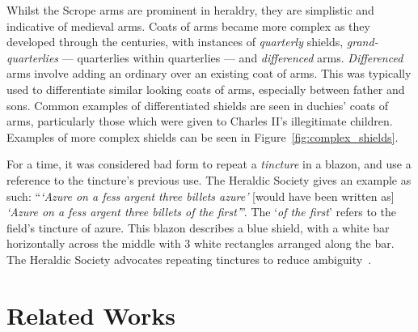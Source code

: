 \documentclass[nobib, a4paper, twoside, justified]{tufte-book}
\makeatletter
\newcommand{\blazon}{\gls{blazon}\@\xspace}
\makeatother
\begin{document}
Whilst the Scrope arms are prominent in heraldry, they are simplistic and indicative of
medieval arms. Coats of arms became more complex as they developed through the centuries, with
instances of \textit{quarterly} shields, \textit{grand-quarterlies} --- quarterlies within
quarterlies --- and \textit{differenced} arms. \textit{Differenced} arms involve adding an
\gls{ordinary} over an existing coat of arms. This was typically used to differentiate similar
looking coats of arms, especially between father and sons. Common examples of differentiated
shields are seen in duchies' coats of arms, particularly those which were given to Charles II's
illegitimate children. Examples of more complex shields can be seen in
Figure~\ref{fig:complex_shields}.

\begin{figure*}[h]
  \qquad
  \caption{Some examples of more complex coats of arms.}\label{fig:complex_shields}
\end{figure*}

For a time, it was considered bad form to repeat a \textit{tincture} in a \blazon, and use a
reference to the tincture's previous use. The Heraldic Society gives an example as such:
``\textit{`Azure on a fess argent three billets azure'} [would have been written as] \textit{`Azure
on a fess argent three billets of the first'}''. The `\textit{of the first}' refers to the field's
tincture of azure. This \blazon describes a blue shield, with a white bar horizontally across the
middle with 3 white rectangles arranged along the bar. The Heraldic Society advocates repeating
tinctures to reduce ambiguity~\autocite{blazon_in_coa}.

\section{Related Works}%
\label{sec:related_works}
\end{document}
